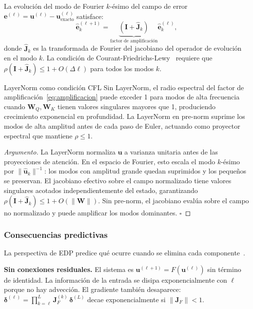 La evolución del modo de Fourier $k$-ésimo del campo de error
$\bm{e}^{(\ell)} = \bm{u}^{(\ell)} - \bm{u}^{(\ell)}_{\mathrm{exacto}}$
satisface:
\begin{equation}
  \hat{\bm{e}}_k^{(\ell+1)}
  = \underbrace{\left(\bm{I} +
    \hat{\bm{J}}_k\right)}_{\text{factor de amplificación}}
    \hat{\bm{e}}_k^{(\ell)},
  \label{eq:amplificacion}
\end{equation}
donde $\hat{\bm{J}}_k$ es la transformada de Fourier del jacobiano
del operador de evolución en el modo $k$. La condición de
Courant-Friedrichs-Lewy~\cite{courant1928partiellen} requiere que
$\rho(\bm{I} + \hat{\bm{J}}_k) \leq 1 + O(\Delta\ell)$ para
todos los modos $k$.

\begin{proposicion}{LayerNorm como condición CFL}
\label{prop:layernorm_cfl}
Sin LayerNorm, el radio espectral del factor de
amplificación~\eqref{eq:amplificacion} puede exceder 1 para modos
de alta frecuencia cuando $\bm{W}_Q, \bm{W}_K$ tienen valores
singulares mayores que 1, produciendo crecimiento exponencial en
profundidad. La LayerNorm en pre-norm suprime los modos de alta
amplitud antes de cada paso de Euler, actuando como proyector
espectral que mantiene $\rho \leq 1$.
\end{proposicion}

\begin{proof}[Argumento]
La LayerNorm normaliza $\bm{u}$ a varianza unitaria antes de
las proyecciones de atención. En el espacio de Fourier, esto
escala el modo $k$-ésimo por $\|\hat{\bm{u}}_k\|^{-1}$:
los modos con amplitud grande quedan suprimidos y los pequeños se
preservan. El jacobiano efectivo sobre el campo normalizado tiene
valores singulares acotados independientemente del estado,
garantizando $\rho(\bm{I}+\hat{\bm{J}}_k) \leq 1+O(\|\bm{W}\|)$.
Sin pre-norm, el jacobiano evalúa sobre el campo no normalizado
y puede amplificar los modos dominantes. $\square$
\end{proof}

\subsubsection*{Consecuencias predictivas}

La perspectiva de EDP predice qué ocurre cuando se elimina cada
componente~\cite{transformer_pde_2024}.

\medskip
\noindent\textbf{Sin conexiones residuales.} El sistema es
$\bm{u}^{(\ell+1)} = F(\bm{u}^{(\ell)})$ sin término de identidad.
La información de la entrada se disipa exponencialmente con $\ell$
porque no hay advección. El gradiente también desaparece:
$\bm{\delta}^{(\ell)} = \prod_{k=\ell}^{L}\bm{J}_F^{(k)}\,
\bm{\delta}^{(L)}$ decae exponencialmente si $\|\bm{J}_F\| < 1$.

